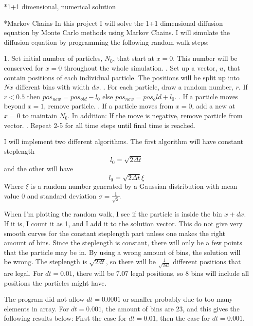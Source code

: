 \documentclass[a4paper, 12pt, titlepage]{article}
\newcommand{\beq}{\begin{equation*}}
\newcommand{\eeq}{\end{equation*}}
\newcommand{\n}{\newline}
\begin{document}
 \begin{section}*{1+1 dimensional, numerical solution}
  \begin{subsection}*{Markov Chains}
  In this project I will solve the 1+1 dimensional diffusion equation by Monte Carlo methods using Markov 
  Chains. I will simulate the diffusion equation by programming the following random walk steps: \par
  1. Set initial number of particles, $N_0$, that start at $x=0$. This number will be conserved for $x = 0$
  throughout the whole simulation. \n
  2. Set up a vector, $u$, that contain positions of each individual particle. The positions will be split
  up into $Nx$ different bins with width $dx$. \n
  3. For each particle, draw a random number, $r$. If $ r < 0.5 $ then $ pos_{new} = pos_{old} - l_0$
     else $pos_{new} = pos_old + l_0$. \n
  4. If a particle moves beyond $x=1$, remove particle. \n
  5. If a particle moves from $x=0$, add a new at $x=0$ to maintain $N_0$. In addition: If the move is 
     negative, remove particle from vector. \n
  6. Repeat 2-5 for all time steps until final time is reached. \par
  I will implement two different algorithms. The first algorithm will have constant steplength
  \beq l_0 = \sqrt{2\Delta t} \eeq 
  and the other will have \beq l_0 = \sqrt{2\Delta t}\xi \eeq
  Where $\xi$ is a random number generated by a Gaussian distribution with mean value $0$ and standard
  deviation $\sigma = \frac{1}{\sqrt{2}}$. 
  
  When I'm plotting the random walk, I see if the particle is inside the bin $x + dx$. If it is, I count 
  it as 1, and I add it to the solution vector. This do not give very smooth curves for the constant steplength
  part unless one makes the right amount of bins. Since the steplength is constant, there will only be 
  a few points that the particle may be in. By using a wrong amount of bins, the solution will be wrong.
  The steplength is $\sqrt{2dt}$, so there will be $\frac{1}{\sqrt{2dt}}$ different positions that are legal.
  For $dt = 0.01$, there will be 7.07 legal positions, so 8 bins will include all positions the particles might
  have.
 
  The program did not allow $dt = 0.0001$ or smaller probably due to too many elements in array. 
  For $dt = 0.001$, the amount of bins are $23$, and this gives the following results below:
  First the case for $dt = 0.01$, then the case for $dt = 0.001$.
  

\end{subsection}
\end{section}
\end{document}
